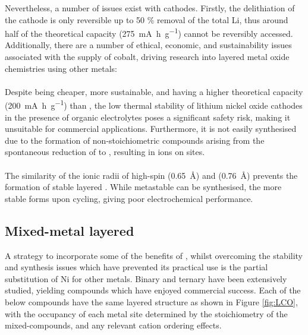 Nevertheless, a number of issues exist with  cathodes.
Firstly, the delithiation of the cathode is only reversible up to 50 \% removal of the total Li, thus around half of the theoretical capacity (\SI{275}{\milli\ampere\hour\per\gram}) cannot be reversibly accessed.\cite{Rozier2015}
Additionally, there are a number of ethical, economic, and sustainability issues associated with the supply of cobalt,\cite{Mauger2017, Larcher2015} driving research into layered metal oxide chemistries using other metals:\cite{Rozier2015}

\paragraph{}
Despite being cheaper, more sustainable, and having a higher theoretical capacity (\SI{200}{\milli\ampere\hour\per\gram}) than , the low thermal stability of lithium nickel oxide cathodes in the presence of organic electrolytes poses a significant safety risk, making it unsuitable for commercial applications.
	Furthermore, it is not easily synthesised due to the formation of non-stoichiometric compounds arising from the spontaneous reduction of  to  , resulting in  ions on  sites.\cite{Das2017}
\paragraph{} 
The similarity of the ionic radii of high-spin  (\SI{0.65}{\angstrom}) and  (\SI{0.76}{\angstrom}) prevents the formation of stable layered .\cite{Rozier2015,Rossen1992}
	While metastable  can be synthesised, the more stable  forms upon cycling, giving poor electrochemical performance.


\newpage
\subsection{Mixed-metal layered }
A strategy to incorporate some of the benefits of , whilst overcoming the stability and synthesis issues which have prevented its practical use is the partial substitution of Ni for other metals.\cite{Rozier2015}
Binary and ternary  have been extensively studied, yielding compounds which have enjoyed commercial success.
Each of the below compounds have the same layered structure as  shown in Figure \ref{fig:LCO}, with the occupancy of each metal site determined by the stoichiometry of the mixed-compounds, and any relevant cation ordering effects.

